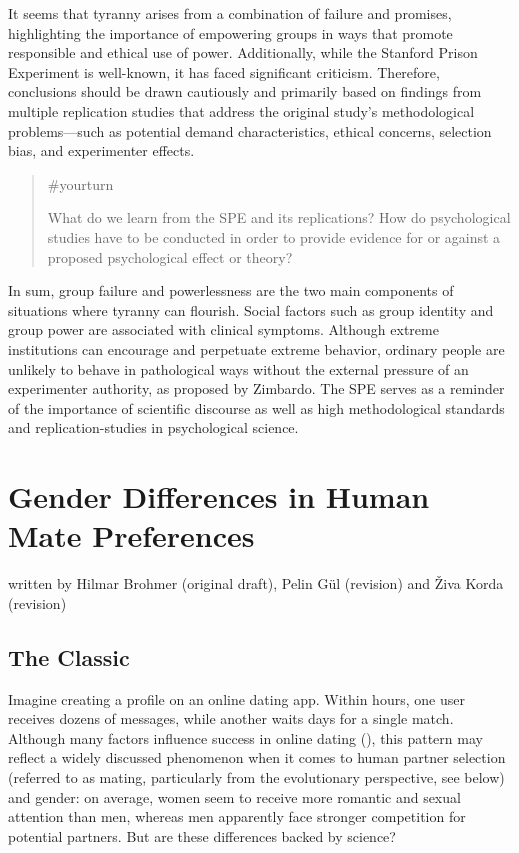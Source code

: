 \documentclass[
  letterpaper,
]{book}
\begin{document}
It seems that tyranny arises from a combination of failure and promises,
highlighting the importance of empowering groups in ways that promote
responsible and ethical use of power. Additionally, while the Stanford
Prison Experiment is well-known, it has faced significant criticism.
Therefore, conclusions should be drawn cautiously and primarily based on
findings from multiple replication studies that address the original
study's methodological problems---such as potential demand
characteristics, ethical concerns, selection bias, and experimenter
effects.

\begin{quote}
{\#yourturn}

What do we learn from the SPE and its replications? How do psychological
studies have to be conducted in order to provide evidence for or against
a proposed psychological effect or theory?
\end{quote}

In sum, group failure and powerlessness are the two main components of
situations where tyranny can flourish. Social factors such as group
identity and group power are associated with clinical symptoms. Although
extreme institutions can encourage and perpetuate extreme behavior,
ordinary people are unlikely to behave in pathological ways without the
external pressure of an experimenter authority, as proposed by Zimbardo.
The SPE serves as a reminder of the importance of scientific discourse
as well as high methodological standards and replication-studies in
psychological science.


\chapter{\texorpdfstring{{Gender Differences in Human Mate
Preferences}}{Gender Differences in Human Mate Preferences}}\label{gender-differences-in-human-mate-preferences}

{written by Hilmar Brohmer (original draft), Pelin Gül (revision) and
Živa Korda (revision)}

\section{The Classic}\label{the-classic-13}

Imagine creating a profile on an online dating app. Within hours, one
user receives dozens of messages, while another waits days for a single
match. Although many factors influence success in online dating
(), this pattern may
reflect a widely discussed phenomenon when it comes to human partner
selection (referred to as mating, particularly from the evolutionary
perspective, see below) and gender: on average, women seem to receive
more romantic and sexual attention than men, whereas men apparently face
stronger competition for potential partners. But are these differences
backed by science?
\end{document}
